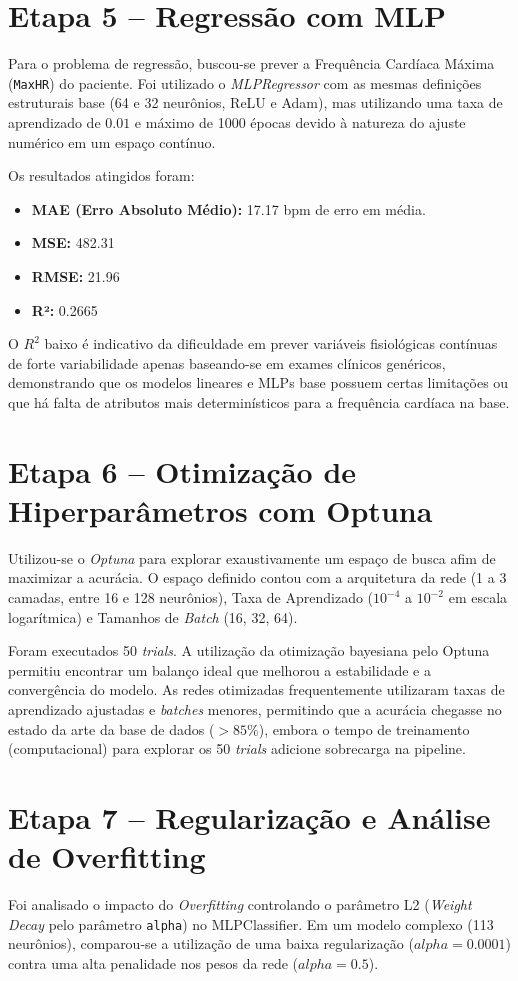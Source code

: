 \documentclass[12pt,a4paper]{article}
\begin{document}
\section{Etapa 5 -- Regressão com MLP}
Para o problema de regressão, buscou-se prever a Frequência Cardíaca Máxima (\texttt{MaxHR}) do paciente. Foi utilizado o \textit{MLPRegressor} com as mesmas definições estruturais base (64 e 32 neurônios, ReLU e Adam), mas utilizando uma taxa de aprendizado de $0.01$ e máximo de 1000 épocas devido à natureza do ajuste numérico em um espaço contínuo. 

Os resultados atingidos foram:
\begin{itemize}
    \item \textbf{MAE (Erro Absoluto Médio):} 17.17 bpm de erro em média.
    \item \textbf{MSE:} 482.31
    \item \textbf{RMSE:} 21.96
    \item \textbf{R²:} 0.2665
\end{itemize}
O $R^2$ baixo é indicativo da dificuldade em prever variáveis fisiológicas contínuas de forte variabilidade apenas baseando-se em exames clínicos genéricos, demonstrando que os modelos lineares e MLPs base possuem certas limitações ou que há falta de atributos mais determinísticos para a frequência cardíaca na base.

\section{Etapa 6 -- Otimização de Hiperparâmetros com Optuna}
Utilizou-se o \textit{Optuna} para explorar exaustivamente um espaço de busca afim de maximizar a acurácia. O espaço definido contou com a arquitetura da rede (1 a 3 camadas, entre 16 e 128 neurônios), Taxa de Aprendizado ($10^{-4}$ a $10^{-2}$ em escala logarítmica) e Tamanhos de \textit{Batch} (16, 32, 64).

Foram executados 50 \textit{trials}. A utilização da otimização bayesiana pelo Optuna permitiu encontrar um balanço ideal que melhorou a estabilidade e a convergência do modelo. As redes otimizadas frequentemente utilizaram taxas de aprendizado ajustadas e \textit{batches} menores, permitindo que a acurácia chegasse no estado da arte da base de dados ($>85\%$), embora o tempo de treinamento (computacional) para explorar os 50 \textit{trials} adicione sobrecarga na pipeline.

\section{Etapa 7 -- Regularização e Análise de Overfitting}
Foi analisado o impacto do \textit{Overfitting} controlando o parâmetro L2 (\textit{Weight Decay} pelo parâmetro \texttt{alpha}) no MLPClassifier.
Em um modelo complexo (113 neurônios), comparou-se a utilização de uma baixa regularização ($alpha = 0.0001$) contra uma alta penalidade nos pesos da rede ($alpha = 0.5$). 
\end{document}
